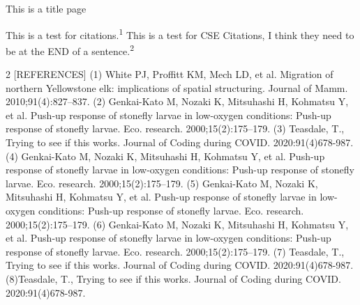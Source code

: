 \documentclass[12pt]{article}
\begin{document}
\begin{titlepage}
This is a title page
\end{titlepage}
\newpage
This is a test for citations.\textsuperscript{1}
\newpage
This is a test for CSE Citations, I think they need to be at the END of a sentence.\textsuperscript{2}
\newpage
\begin{multicols} {2} [REFERENCES]
(1) White PJ, Proffitt KM, Mech LD, et al. Migration of northern Yellowstone elk: implications of spatial structuring. Journal of Mamm. 2010;91(4):827–837.\newline\newline
(2) Genkai-Kato M, Nozaki K, Mitsuhashi H, Kohmatsu Y, et al. Push-up response of stonefly larvae in low-oxygen conditions: Push-up response of stonefly larvae. Eco. research. 2000;15(2):175–179.\newline\newline
(3) Teasdale, T., Trying to see if this works. Journal of Coding during COVID. 2020:91(4)678-987.\newline \newline
(4) Genkai-Kato M, Nozaki K, Mitsuhashi H, Kohmatsu Y, et al. Push-up response of stonefly larvae in low-oxygen conditions: Push-up response of stonefly larvae. Eco. research. 2000;15(2):175–179.\newline\newline
(5) Genkai-Kato M, Nozaki K, Mitsuhashi H, Kohmatsu Y, et al. Push-up response of stonefly larvae in low-oxygen conditions: Push-up response of stonefly larvae. Eco. research. 2000;15(2):175–179.\newline\newline
(6) Genkai-Kato M, Nozaki K, Mitsuhashi H, Kohmatsu Y, et al. Push-up response of stonefly larvae in low-oxygen conditions: Push-up response of stonefly larvae. Eco. research. 2000;15(2):175–179.\newline\newline
(7) Teasdale, T., Trying to see if this works. Journal of Coding during COVID. 2020:91(4)678-987.\newline \newline
(8)Teasdale, T., Trying to see if this works. Journal of Coding during COVID. 2020:91(4)678-987.\newline \newline 
\end{multicols}
\end{document}
